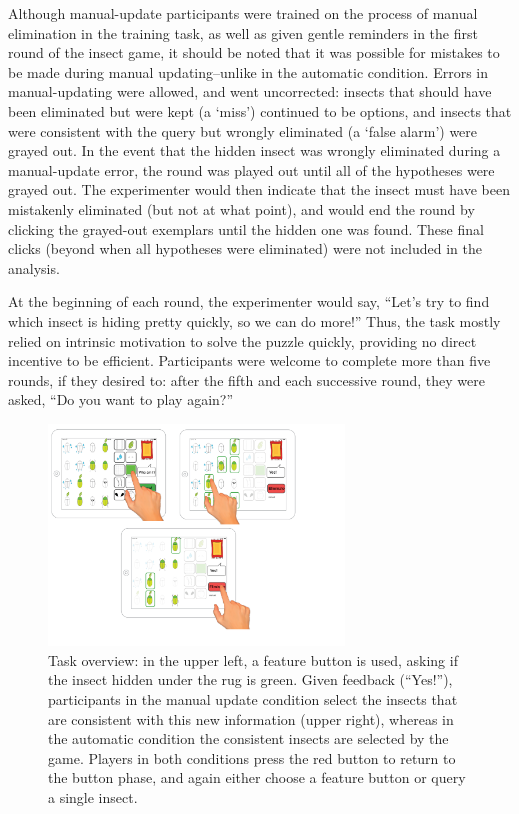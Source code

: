 \documentclass[man,floatsintext]{apa6}
\begin{document}
Although manual-update participants were trained on the process of manual elimination in the 
training task, as well as given gentle reminders in the first round of the insect game, it should be 
noted that it was possible for mistakes to be made during manual updating--unlike in the automatic 
condition. Errors in manual-updating were allowed, and went uncorrected: insects that should have been eliminated but were kept (a `miss') continued to be options, and insects that were consistent with the query but wrongly eliminated (a `false alarm') were grayed out. In the event that the hidden insect was wrongly eliminated during a manual-update error, the round was played out until all of the hypotheses were grayed out. The experimenter would then indicate that the insect must have been mistakenly eliminated (but not at what point), and would end the round by clicking the grayed-out exemplars until the hidden one was found. These final clicks (beyond when all hypotheses were eliminated) were not included in the analysis.

At the beginning of each round, the experimenter would say, ``Let's try to find which insect is hiding pretty quickly, so we can do more!'' Thus, the task mostly relied on intrinsic motivation to solve the puzzle quickly, providing no direct incentive to be efficient. Participants were welcome to complete more than five rounds, if they desired to: after the fifth and each successive round, they were asked, ``Do you want to play again?''

\begin{figure}[!h]
  \centering
  \includegraphics[width=0.7\textwidth]{figures/task_overview}
  \caption{Task overview: in the upper left, a feature button is used, asking if the insect 
hidden under the rug is green. Given feedback (``Yes!''), participants in the manual 
update condition select the insects that are consistent with this new information (upper 
right), whereas in the automatic condition the consistent insects are selected by the 
game. Players in both conditions press the red button to return to the button phase, 
and again either choose a feature button or query a single insect.}
  \label{fig:task-overview}
\end{figure} 
\end{document}
